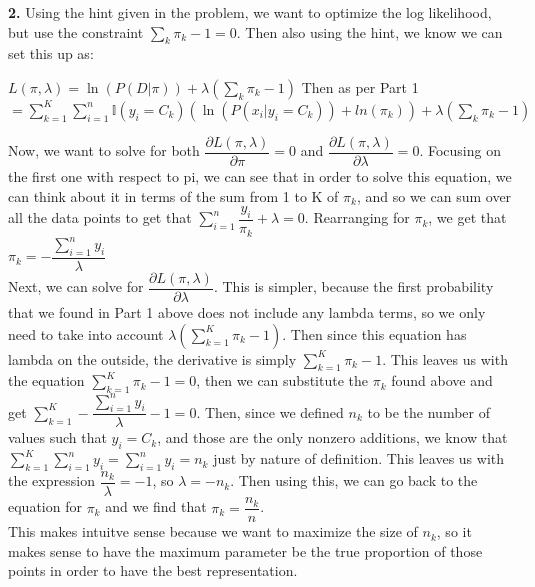 \documentclass[submit]{harvardml}
\begin{document}
 \textbf{2.} Using the hint given in the problem, we want to optimize the log likelihood, but use the constraint $\sum_{k} \pi_k - 1 = 0$. Then also using the hint, we know we can set this up as: 
 \begin{center}
    $L(\pi, \lambda) = \ln(P(D | \pi)) + \lambda(\sum_{k}\pi_k - 1)$ Then as per Part 1 $= \sum_{k=1}^{K} \sum_{i=1}^{n} \mathbb{I}(y_i = C_k)(\ln(P(x_i | y_i = C_k)) + ln(\pi_k)) + \lambda(\sum_{k}\pi_k - 1)$
 \end{center}
 Now, we want to solve for both $\dfrac{\partial L(\pi, \lambda)}{\partial \pi} = 0$ and $\dfrac{\partial L(\pi, \lambda)}{\partial \lambda} = 0$. Focusing on the first one with respect to pi, we can see that
 in order to solve this equation, we can think about it in terms of the sum from 1 to K of $\pi_k$, and so we can sum over all the data points to get that $\sum_{i=1}^{n}\dfrac{y_i}{\pi_k} + \lambda = 0$. Rearranging for $\pi_k$, 
 we get that $\pi_k = - \dfrac{\sum_{i=1}^{n} y_i}{\lambda}$ \\
 Next, we can solve for $\dfrac{\partial L(\pi, \lambda)}{\partial \lambda}$. This is simpler, because the first probability that we found in Part 1 above does not include any lambda terms, so we only need to take into account
 $\lambda(\sum_{k=1}^{K} \pi_k - 1)$. Then since this equation has lambda on the outside, the derivative is simply $\sum_{k=1}^{K} \pi_k - 1$. This leaves us with the equation $\sum_{k=1}^{K} \pi_k - 1 = 0$, then we can substitute
 the $\pi_k$ found above and get $\sum_{k=1}^{K} - \dfrac{\sum_{i=1}^{n} y_i}{\lambda} - 1 = 0$. Then, since we defined $n_k$ to be the number of values such that $y_i = C_k$, and those are the only nonzero additions, we know that 
 $\sum_{k=1}^{K} \sum_{i=1}^{n} y_i = \sum_{i=1}^{n} y_i = n_k$ just by nature of definition. This leaves us with the expression $\dfrac{n_k}{\lambda} = -1$, so $\lambda = -n_k$. Then using this, we can go back to the equation for $\pi_k$
 and we find that $\pi_k = \dfrac{n_k}{n}$. \\
 This makes intuitve sense because we want to maximize the size of $n_k$, so it makes sense to have the maximum parameter be the true proportion of those points in order to have the best representation. \\\\
\end{document}
